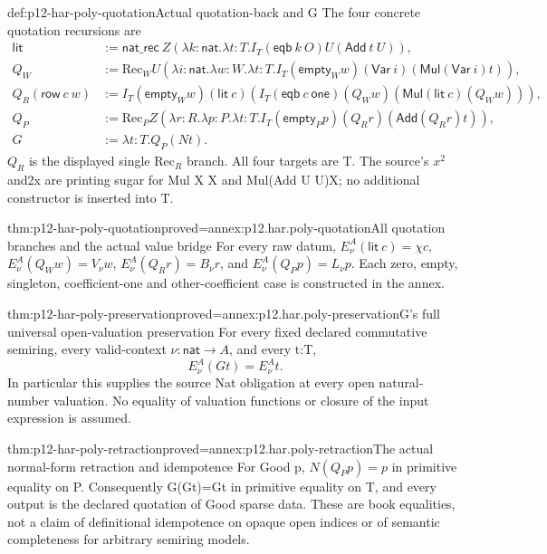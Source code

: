 \begin{hbdefinition}{def:p12-har-poly-quotation}{Actual quotation-back and G}
The four concrete quotation recursions are
\[
\begin{aligned}
 \mathsf{lit}&:=\mathsf{nat\_rec}\ Z
    (\lambda k:\mathsf{nat}.\lambda t:T.
        I_T(\mathsf{eqb}\ k\ O)U(\mathsf{Add}\ t\ U)),\\
 Q_W&:=\mathrm{Rec}_W U
    (\lambda i:\mathsf{nat}.\lambda w:W.\lambda t:T.
       I_T(\mathsf{empty}_W w)(\mathsf{Var}\ i)
                    (\mathsf{Mul}(\mathsf{Var}\ i)t)),\\
 Q_R(\mathsf{row}\ c\ w)&:=
   I_T(\mathsf{empty}_W w)(\mathsf{lit}\ c)
      (I_T(\mathsf{eqb}\ c\ \mathsf{one})(Q_Ww)
                          (\mathsf{Mul}(\mathsf{lit}\ c)(Q_Ww))),\\
 Q_P&:=\mathrm{Rec}_P Z
   (\lambda r:R.\lambda p:P.\lambda t:T.
        I_T(\mathsf{empty}_P p)(Q_Rr)(\mathsf{Add}(Q_Rr)t)),\\
 G&:=\lambda t:T.Q_P(Nt).
\end{aligned}
\]
\(Q_R\) is the displayed single \(\mathrm{Rec}_R\) branch. All four targets are T.
The source's \(x^2\) and2x are printing sugar for Mul X X and
Mul(Add U U)X; no additional constructor is inserted into T.
\end{hbdefinition}

\begin{hblemma}{thm:p12-har-poly-quotation}{proved=annex:p12.har.poly-quotation}{All quotation branches and the actual value bridge}
For every raw datum,
\(E_\nu^A(\mathsf{lit}\ c)=\chi c\),
\(E_\nu^A(Q_W w)=V_\nu w\),
\(E_\nu^A(Q_R r)=B_\nu r\), and
\(E_\nu^A(Q_P p)=L_\nu p\).
Each zero, empty, singleton, coefficient-one and other-coefficient case
is constructed in the annex.
\end{hblemma}

\begin{hbtheorem}{thm:p12-har-poly-preservation}{proved=annex:p12.har.poly-preservation}{G's full universal open-valuation preservation}
For every fixed declared commutative semiring, every valid-context
\(\nu:\mathsf{nat}\to A\), and every t:T,
\[
 E_\nu^A(Gt)=E_\nu^A t.
\]
In particular this supplies the source Nat obligation at every open
natural-number valuation. No equality of valuation functions or closure
of the input expression is assumed.
\end{hbtheorem}

\begin{hbtheorem}{thm:p12-har-poly-retraction}{proved=annex:p12.har.poly-retraction}{The actual normal-form retraction and idempotence}
For Good p, \(N(Q_Pp)=p\) in primitive equality on P.
Consequently G(Gt)=Gt in primitive equality on T, and every output is
the declared quotation of Good sparse data. These are book equalities,
not a claim of definitional idempotence on opaque open indices or of
semantic completeness for arbitrary semiring models.
\end{hbtheorem}

